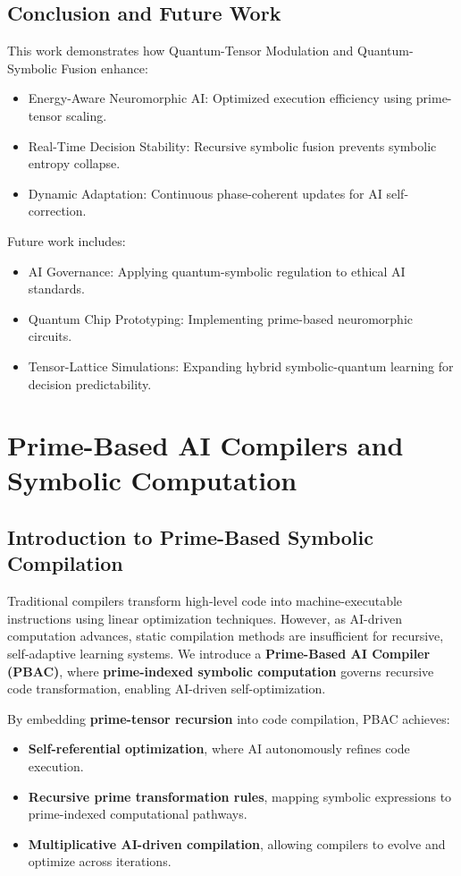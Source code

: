 \documentclass{article}
\theoremstyle{plain}
\theoremstyle{plain}
\theoremstyle{definition}
\theoremstyle{remark}
\begin{document}
\subsection{Conclusion and Future Work}
This work demonstrates how Quantum-Tensor Modulation and Quantum-Symbolic Fusion enhance:
\begin{itemize}
    \item Energy-Aware Neuromorphic AI: Optimized execution efficiency using prime-tensor scaling.
    \item Real-Time Decision Stability: Recursive symbolic fusion prevents symbolic entropy collapse.
    \item Dynamic Adaptation: Continuous phase-coherent updates for AI self-correction.
\end{itemize}
Future work includes:
\begin{itemize}
    \item AI Governance: Applying quantum-symbolic regulation to ethical AI standards.
    \item Quantum Chip Prototyping: Implementing prime-based neuromorphic circuits.
    \item Tensor-Lattice Simulations: Expanding hybrid symbolic-quantum learning for decision predictability.
\end{itemize}

\section{Prime-Based AI Compilers and Symbolic Computation}

\subsection{Introduction to Prime-Based Symbolic Compilation}

Traditional compilers transform high-level code into machine-executable instructions using linear optimization techniques. However, as AI-driven computation advances, static compilation methods are insufficient for recursive, self-adaptive learning systems. We introduce a \textbf{Prime-Based AI Compiler (PBAC)}, where \textbf{prime-indexed symbolic computation} governs recursive code transformation, enabling AI-driven self-optimization.

By embedding \textbf{prime-tensor recursion} into code compilation, PBAC achieves:
\begin{itemize}
    \item \textbf{Self-referential optimization}, where AI autonomously refines code execution.
    \item \textbf{Recursive prime transformation rules}, mapping symbolic expressions to prime-indexed computational pathways.
    \item \textbf{Multiplicative AI-driven compilation}, allowing compilers to evolve and optimize across iterations.
\end{itemize}
\end{document}
